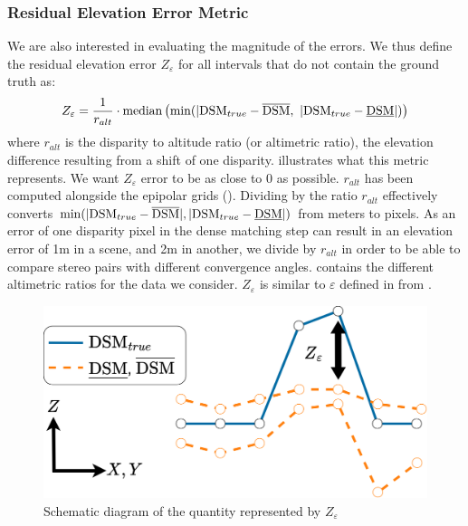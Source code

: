 \subsubsection{Residual Elevation Error Metric}
We are also interested in evaluating the magnitude of the errors. We thus define the residual elevation error $Z_{\varepsilon}$ for all intervals that do not contain the ground truth as:
\begin{align}
    Z_\varepsilon=\dfrac{1}{r_{alt}} \cdot\operatorname*{median} \left( \min(|\mathrm{DSM}_{true}-\overline{\mathrm{DSM}}, ~ |\mathrm{DSM}_{true}-\underline{\mathrm{DSM}}|)\right)\label{eq:residual_error_elevation}
\end{align}
where $r_{alt}$ is the disparity to altitude ratio (or altimetric ratio), \ie the elevation difference resulting from a shift of one disparity.  illustrates what this metric represents. We want $Z_\varepsilon$ error to be as close to 0 as possible. $r_{alt}$ has been computed alongside the epipolar grids (). Dividing by the ratio $r_{alt}$ effectively converts $\min(|\mathrm{DSM}_{true}-\overline{\mathrm{DSM}}|, |\mathrm{DSM}_{true}-\underline{\mathrm{DSM}}|)$ from meters to pixels. As an error of one disparity pixel in the dense matching step can result in an elevation error of 1m in a scene, and 2m in another, we divide by $r_{alt}$ in order to be able to compare stereo pairs with different convergence angles.  contains the different altimetric ratios for the data we consider. $Z_{\varepsilon}$ is similar to $\varepsilon$ defined in  from .

\begin{figure}
    \centering
    \includegraphics[width=0.7\linewidth]{Images/Chap_6/Intervals_elevation_metrics_Z_eps.png}
    \caption{Schematic diagram of the quantity represented by $Z_{\varepsilon}$}
    \label{fig:Intervals_elevation_metrics_Z_eps}
\end{figure}

